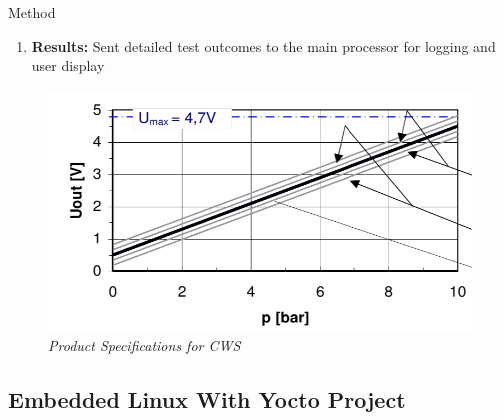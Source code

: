 \documentclass[8pt,compress,aspectratio=169]{beamer}
\newcommand\LightBold[1]{\textcolor{VSBlueLight}{\textbf{#1}}}
\begin{document}
\begin{frame}
\begin{minipage}{0.485\textwidth}
\begin{block}{Method}
{\begin{enumerate}
                    \item \LightBold{Results:} Sent detailed test outcomes to the main processor for logging and user display
                \end{enumerate}
            }
        \end{block}
    \end{minipage}
    \hfill
    \begin{minipage}{0.50\textwidth}
        \begin{figure}
            \centering
            \includegraphics[width=\textwidth]{assets/specs/adc_product_specs.png}
            \caption{\it Product Specifications for CWS}
        \end{figure}
        \vspace{0.2cm}
    \end{minipage}
\end{frame}

\subsection{Embedded Linux With Yocto Project}
\end{document}
